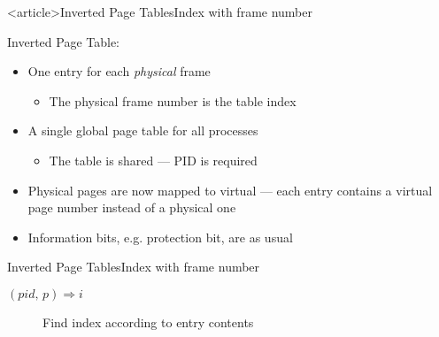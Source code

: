 \begin{frame}<article>{Inverted Page Tables}{Index with frame number}
  \begin{iblock}{Inverted Page Table:}
    \begin{itemize}
    \item One entry for each \emph{physical} frame
      \begin{itemize}
      \item The physical frame number is the table index
      \end{itemize}
    \item A single global page table for all processes
      \begin{itemize}
      \item The table is shared --- PID is required
      \end{itemize}
    \end{itemize}
  \end{iblock}
  \begin{itemize}
  \item Physical pages are now mapped to virtual --- each entry contains a virtual page
    number instead of a physical one
  \item Information bits, e.g. protection bit, are as usual
  \end{itemize}
\end{frame}

\begin{frame}{Inverted Page Tables}{Index with frame number}
  \begin{description}
  \item[$(pid,\,p)\Rightarrow{}i$] \quad Find index according to entry contents
  \end{description}
  \centering
\end{frame}

